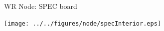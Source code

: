 \documentclass[compress,red]{beamer}
\begin{document}
\begin{frame}{WR Node: SPEC board}

    \begin{center}
    \texttt{[image: ../../figures/node/specInterior.eps]}
    \end{center}

\end{frame}
\end{document}
